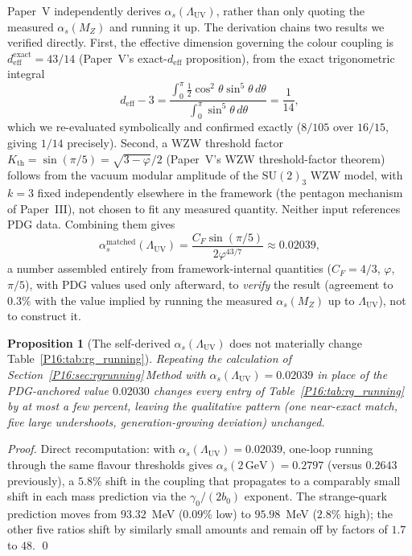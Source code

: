 \documentclass[11pt,a4paper]{article}
\newtheorem{proposition}[theorem]{Proposition}
\theoremstyle{definition}\newtheorem{definition}[theorem]{Definition}
\theoremstyle{remark}
\theoremstyle{definition}\newtheorem{construction}[theorem]{Construction}
\newcommand{\vp}{\varphi}
\newcommand{\LUV}{\Lambda_{\mathrm{UV}}}
\newcommand{\SU}{\mathrm{SU}}
\newcommand{\deff}{d_{\mathrm{eff}}}
\begin{document}
Paper~V independently derives $\alpha_s(\LUV)$, rather than only
quoting the measured $\alpha_s(M_Z)$ and running it up. The
derivation chains two results we verified directly. First, the
effective dimension governing the colour coupling is
$\deff^{\mathrm{exact}}=43/14$ (Paper~V's exact-$\deff$
proposition), from the exact trigonometric
integral
\begin{equation}
  \deff-3 = \frac{\int_0^\pi\tfrac12\cos^2\theta\sin^5\theta\,d\theta}
                 {\int_0^\pi\sin^5\theta\,d\theta} = \frac{1}{14},
  \label{P16:eq:deff_recap}
\end{equation}
which we re-evaluated symbolically and confirmed exactly
($8/105$ over $16/15$, giving $1/14$ precisely). Second, a WZW
threshold factor $K_{\mathrm{th}}=\sin(\pi/5)=\sqrt{3-\vp}/2$ (Paper~V's
WZW threshold-factor theorem) follows from the vacuum modular amplitude
of the $\SU(2)_3$ WZW model, with $k=3$ fixed independently elsewhere
in the framework (the pentagon mechanism of Paper~III), not chosen to
fit any measured quantity. Neither input references PDG data. Combining
them gives
\begin{equation}
  \alpha_s^{\mathrm{matched}}(\LUV)
  = \frac{C_F\sin(\pi/5)}{2\vp^{43/7}}
  \approx 0.02039,
  \label{P16:eq:as_LUV_recap}
\end{equation}
a number assembled entirely from framework-internal quantities
($C_F=4/3$, $\vp$, $\pi/5$), with PDG values used only afterward, to
\emph{verify} the result (agreement to $0.3\%$ with the value implied
by running the measured $\alpha_s(M_Z)$ up to $\LUV$), not to
construct it.

\begin{proposition}[The self-derived $\alpha_s(\LUV)$ does not
  materially change Table~\ref{P16:tab:rg_running}]
\label{P16:prop:as_selfcons}
Repeating the calculation of Section~\ref{P16:sec:rgrunning}\,Method with
$\alpha_s(\LUV)=0.02039$ in place of the PDG-anchored value
$0.02030$ changes every entry of Table~\ref{P16:tab:rg_running} by at most
a few percent, leaving the qualitative pattern (one near-exact match,
five large undershoots, generation-growing deviation) unchanged.
\end{proposition}

\begin{proof}
Direct recomputation: with $\alpha_s(\LUV)=0.02039$, one-loop running
through the same flavour thresholds gives $\alpha_s(2\,\mathrm{GeV})=
0.2797$ (versus $0.2643$ previously), a $5.8\%$ shift in the coupling
that propagates to a comparably small shift in each mass prediction
via the $\gamma_0/(2b_0)$ exponent. The strange-quark prediction moves
from $93.32$~MeV ($0.09\%$ low) to $95.98$~MeV ($2.8\%$ high); the
other five ratios shift by similarly small amounts and remain off by
factors of $1.7$ to $48$.
\qed
\end{proof}
\end{document}

